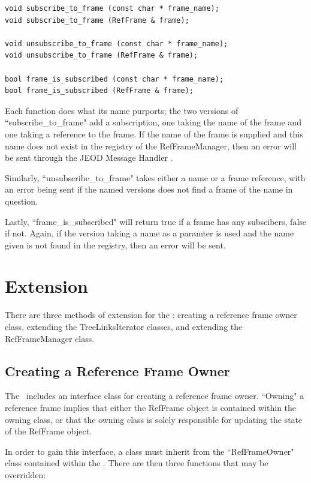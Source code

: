 \begin{verbatim}
void subscribe_to_frame (const char * frame_name);
void subscribe_to_frame (RefFrame & frame);

void unsubscribe_to_frame (const char * frame_name);
void unsubscribe_to_frame (RefFrame & frame);

bool frame_is_subscribed (const char * frame_name);
bool frame_is_subscribed (RefFrame & frame);
\end{verbatim}

Each function does what its name purports; the two versions of
``subscribe\_to\_frame" add a subscription, one taking
the name of the frame and one taking a reference to the frame.
If the name of the frame is supplied and this name does not
exist in the registry of the RefFrameManager, then an error
will be sent through the JEOD Message Handler \cite{dynenv:MESSAGE}.

Similarly, ``unsubscribe\_to\_frame" takes either a name or a frame
reference, with an error being sent if the named versions does not
find a frame of the name in question.

Lastly, ``frame\_is\_subscribed" will return true if a frame
has any subscibers, false if not. Again, if the version taking
a name as a paramter is used and the name given is not found
in the registry, then an error will be sent.

\section{Extension}

There are three methods of extension for the : creating
a reference frame owner class, extending the TreeLinksIterator classes, and
extending the RefFrameManager class.

\subsection{Creating a Reference Frame Owner}

The \ includes an interface class for creating a reference
frame owner. ``Owning" a reference frame implies that either the RefFrame
object is contained within the owning class, or that the owning class is solely
responsible for updating the state of the RefFrame object.

In order to gain this interface, a class must inherit from the ``RefFrameOwner"
class contained within the . There are then three functions
that may be overridden:

